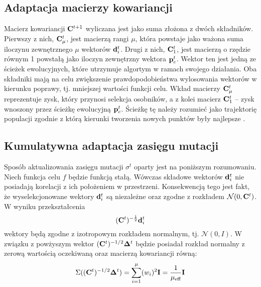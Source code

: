 \subsection{Adaptacja macierzy kowariancji \label{CMA}}
  Macierz kowariancji ${\bf C}^{t+1}$ wyliczana jest jako suma złożona z dwóch składników. Pierwszy z nich, ${\bf C}^t_\mu$, jest macierzą rangi $\mu$, która powstaje jako ważona suma iloczynu zewnętrznego $\mu$ wektorów  ${\bf d}_{i}^{t}$. Drugi z nich,  ${\bf C}^t_1$, jest macierzą o rzędzie równym 1 powstałą jako iloczyn zewnętrzny wektora ${\bf p}_c^t$. Wektor ten jest jedną ze ścieżek ewolucyjnych, które utrzymuje algortym w ramach swojego działania. 
  Oba składniki mają na celu zwiększenie prawdopodobieństwa wylosowania wektorów w kierunku poprawy, tj. mniejszej wartości funkcji celu. Wkład macierzy ${\bf C}^t_\mu$ reprezentuje zysk, który przynosi selekcja osobników, a z kolei macierz ${\bf C}^t_1$ -- zysk wnoszony przez ścieżkę ewolucyjną ${\bf p}_c^t$. Ścieżkę tę należy rozumieć jako trajektorię populacji zgodnie z którą kierunki tworzenia nowych punktów były najlepsze \cite{Hansen2001}.
\subsection{Kumulatywna adaptacja zasięgu mutacji \label{CSA}}
Sposób aktualizowania zasięgu mutacji $\sigma^t$ oparty jest na poniższym rozumowaniu. Niech funkcja celu $f$ będzie funkcją stałą. Wówczas składowe wektorów ${\bf d}_i^t$ nie posiadają korelacji z ich położeniem w przestrzeni.
Konsekwencją tego jest fakt, że wyselekcjonowane wektory  ${\bf d}_i^t$ są niezależne oraz zgodne z rozkładem $\mathcal{N}(0, {\bf C}^{t})$. W wyniku przekształcenia
  \begin{equation}
    ({\bf C}^{t})^{-\frac{1}{2}}{\bf d}_{i}^{t}
  \end{equation}
  wektory będą zgodne z izotropowym rozkładem normalnym, tj. $\mathcal{N}(0, I)$. W związku z powżyszym wektor $({\bf C}^t)^{-1/2} {\bf \Delta}^t$ będzie posiadał rozkład normalny z zerową wartością oczekiwaną
  oraz macierzą kowariancji równą:
  \begin{equation}
    \Sigma(({\bf C}^t)^{-1/2} {\bf \Delta}^t) = \sum_{i=1}^\mu (w_i)^2 {\bf I}=\frac{1}{\mu_\text{eff}} {\bf I}
    \label{eq:01}
  \end{equation}
